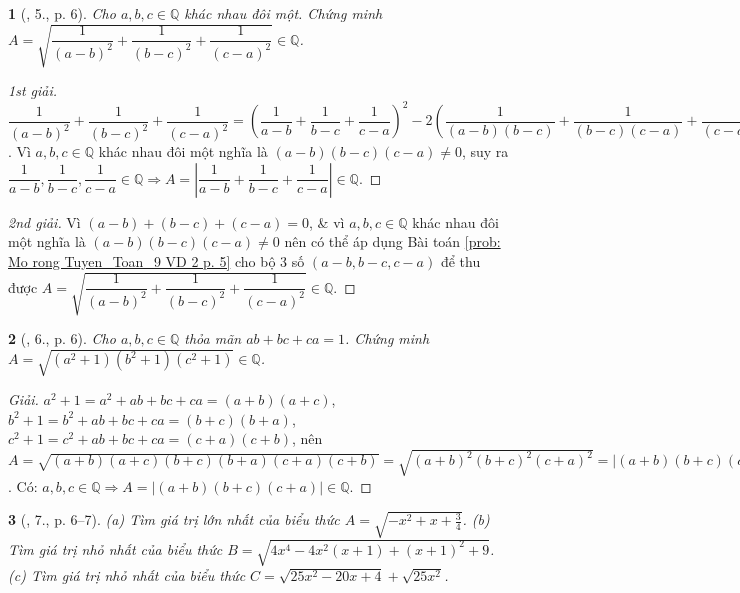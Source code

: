 \documentclass{article}
\newtheorem{baitoan}{}%
\begin{document}
\begin{baitoan}[\cite{Tuyen_Toan_9_old}, 5., p. 6]
	Cho $a,b,c\in\mathbb{Q}$ khác nhau đôi một. Chứng minh $A = \sqrt{\dfrac{1}{(a - b)^2} + \dfrac{1}{(b - c)^2} + \dfrac{1}{(c - a)^2}}\in\mathbb{Q}$.
\end{baitoan}

\begin{proof}[1st giải]
	$\dfrac{1}{(a - b)^2} + \dfrac{1}{(b - c)^2} + \dfrac{1}{(c - a)^2} = \left(\dfrac{1}{a - b} + \dfrac{1}{b - c} + \dfrac{1}{c - a}\right)^2 - 2\left(\dfrac{1}{(a - b)(b - c)} + \dfrac{1}{(b - c)(c - a)} + \dfrac{1}{(c - a)(a - b)}\right) = \left(\dfrac{1}{a - b} + \dfrac{1}{b - c} + \dfrac{1}{c - a}\right)^2 - \dfrac{2(c - a + a - b + b - c)}{(a - b)(b - c)(c - a)} = \left(\dfrac{1}{a - b} + \dfrac{1}{b - c} + \dfrac{1}{c - a}\right)^2\Rightarrow A = \left|\dfrac{1}{a - b} + \dfrac{1}{b - c} + \dfrac{1}{c - a}\right|$. Vì $a,b,c\in\mathbb{Q}$ khác nhau đôi một nghĩa là $(a - b)(b - c)(c - a)\ne0$, suy ra $\dfrac{1}{a - b},\dfrac{1}{b - c},\dfrac{1}{c - a}\in\mathbb{Q}\Rightarrow A = \left|\dfrac{1}{a - b} + \dfrac{1}{b - c} + \dfrac{1}{c - a}\right|\in\mathbb{Q}$.
\end{proof}

\begin{proof}[2nd giải]
	Vì $(a - b) + (b - c) + (c - a) = 0$, \& vì $a,b,c\in\mathbb{Q}$ khác nhau đôi một nghĩa là $(a - b)(b - c)(c - a)\ne0$ nên có thể áp dụng Bài toán \ref{prob: Mo rong Tuyen_Toan_9 VD 2 p. 5} cho bộ 3 số $(a - b,b - c,c - a)$ để thu được $A = \sqrt{\dfrac{1}{(a - b)^2} + \dfrac{1}{(b - c)^2} + \dfrac{1}{(c - a)^2}}\in\mathbb{Q}$.
\end{proof}

\begin{baitoan}[\cite{Tuyen_Toan_9_old}, 6., p. 6]
	Cho $a,b,c\in\mathbb{Q}$ thỏa mãn $ab + bc + ca = 1$. Chứng minh $A = \sqrt{(a^2 + 1)(b^2 + 1)(c^2 + 1)}\in\mathbb{Q}$.
\end{baitoan}

\begin{proof}[Giải]
	$a^2 + 1 = a^2 + ab + bc + ca = (a + b)(a + c)$, $b^2 + 1 = b^2 + ab + bc + ca = (b + c)(b + a)$, $c^2 + 1 = c^2 + ab + bc + ca = (c + a)(c + b)$, nên $A = \sqrt{(a + b)(a + c)(b + c)(b + a)(c + a)(c + b)} = \sqrt{(a + b)^2(b + c)^2(c + a)^2} = |(a + b)(b + c)(c + a)|$. Có: $a,b,c\in\mathbb{Q}\Rightarrow A = |(a + b)(b + c)(c + a)|\in\mathbb{Q}$.
\end{proof}

\begin{baitoan}[\cite{Tuyen_Toan_9_old}, 7., p. 6--7]
	(a) Tìm giá trị lớn nhất của biểu thức $A = \sqrt{-x^2 + x + \frac{3}{4}}$. (b) Tìm giá trị nhỏ nhất của biểu thức $B = \sqrt{4x^4 - 4x^2(x + 1) + (x + 1)^2 + 9}$. (c) Tìm giá trị nhỏ nhất của biểu thức $C = \sqrt{25x^2 - 20x + 4} + \sqrt{25x^2}$.
\end{baitoan}
\end{document}

